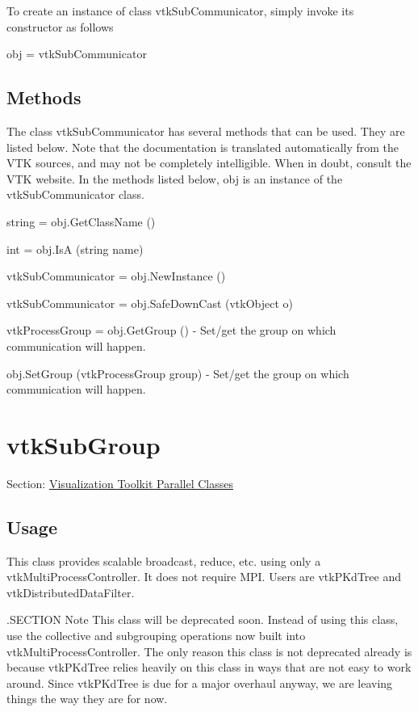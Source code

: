 To create an instance of class vtk\-Sub\-Communicator, simply invoke its constructor as follows \begin{DoxyVerb}  obj = vtkSubCommunicator
\end{DoxyVerb}
 \hypertarget{vtkwidgets_vtkxyplotwidget_Methods}{}\subsection{Methods}\label{vtkwidgets_vtkxyplotwidget_Methods}
The class vtk\-Sub\-Communicator has several methods that can be used. They are listed below. Note that the documentation is translated automatically from the V\-T\-K sources, and may not be completely intelligible. When in doubt, consult the V\-T\-K website. In the methods listed below, {\ttfamily obj} is an instance of the vtk\-Sub\-Communicator class. 
\begin{DoxyItemize}
\item {\ttfamily string = obj.\-Get\-Class\-Name ()}  
\item {\ttfamily int = obj.\-Is\-A (string name)}  
\item {\ttfamily vtk\-Sub\-Communicator = obj.\-New\-Instance ()}  
\item {\ttfamily vtk\-Sub\-Communicator = obj.\-Safe\-Down\-Cast (vtk\-Object o)}  
\item {\ttfamily vtk\-Process\-Group = obj.\-Get\-Group ()} -\/ Set/get the group on which communication will happen.  
\item {\ttfamily obj.\-Set\-Group (vtk\-Process\-Group group)} -\/ Set/get the group on which communication will happen.  
\end{DoxyItemize}\hypertarget{vtkparallel_vtksubgroup}{}\section{vtk\-Sub\-Group}\label{vtkparallel_vtksubgroup}
Section\-: \hyperlink{sec_vtkparallel}{Visualization Toolkit Parallel Classes} \hypertarget{vtkwidgets_vtkxyplotwidget_Usage}{}\subsection{Usage}\label{vtkwidgets_vtkxyplotwidget_Usage}
This class provides scalable broadcast, reduce, etc. using only a vtk\-Multi\-Process\-Controller. It does not require M\-P\-I. Users are vtk\-P\-Kd\-Tree and vtk\-Distributed\-Data\-Filter.

.S\-E\-C\-T\-I\-O\-N Note This class will be deprecated soon. Instead of using this class, use the collective and subgrouping operations now built into vtk\-Multi\-Process\-Controller. The only reason this class is not deprecated already is because vtk\-P\-Kd\-Tree relies heavily on this class in ways that are not easy to work around. Since vtk\-P\-Kd\-Tree is due for a major overhaul anyway, we are leaving things the way they are for now.

